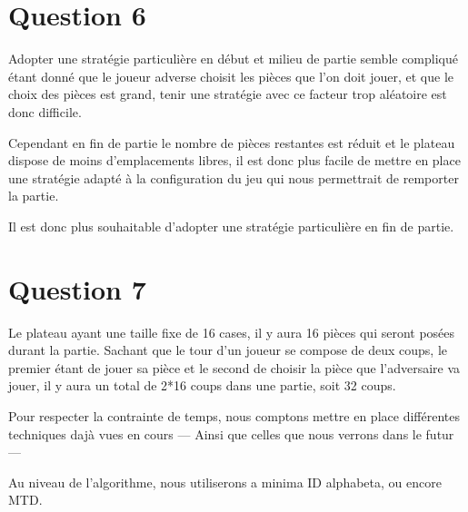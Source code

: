 \documentclass{article}
\begin{document}
\section{Question 6}

Adopter une strat\'egie particuli\`ere en d\'ebut et milieu de partie semble compliqu\'e \'etant donn\'e que le
joueur adverse choisit les pi\`eces que l'on doit jouer, et que le choix des pi\`eces est grand, tenir une
strat\'egie avec ce facteur trop al\'eatoire est donc difficile.


Cependant en fin de partie le nombre de pi\`eces restantes est r\'eduit et le plateau dispose de moins
d'emplacements libres, il est donc plus facile de mettre en place une strat\'egie adapt\'e \`a la configuration
du jeu qui nous permettrait de remporter la partie.


Il est donc plus souhaitable d'adopter une strat\'egie particuli\`ere en fin de partie.


\section{Question 7}
Le plateau ayant une taille fixe de 16 cases, il y aura 16 pi\`eces qui seront pos\'ees durant la partie.
Sachant que le tour d'un joueur se compose de deux coups, le premier \'etant de jouer sa pi\`ece et le
second de choisir la pi\`ece que l'adversaire va jouer, il y aura un total de 2*16 coups dans une partie,
soit 32 coups.


Pour respecter la contrainte de temps, nous comptons mettre en place
diff\'erentes techniques daj\`a vues en
cours --- Ainsi que celles que nous verrons dans le futur ---


Au niveau de l'algorithme, nous utiliserons a minima ID
alphabeta, ou encore MTD. %
\end{document}
